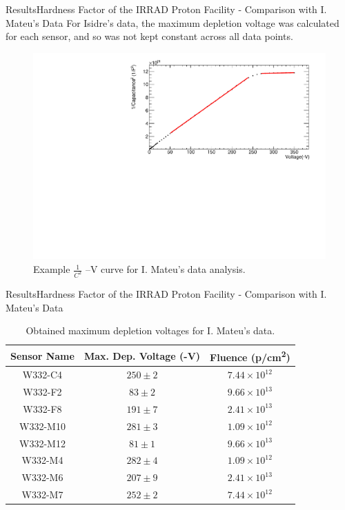 \documentclass{beamer}
\begin{document}
    \begin{frame}{Results}{Hardness Factor of the IRRAD Proton Facility - Comparison with I. Mateu's Data}
    For Isidre's data, the maximum depletion voltage was calculated for each sensor, and so was not kept constant across all data points.
        \begin{figure}
            \centering
            \includegraphics[width = 0.9\linewidth]{IsidreCVexample.pdf}
            \caption{Example $\frac{1}{C^2}$ --V curve for I. Mateu's data analysis.}
        \end{figure}
    \end{frame}
    
    \begin{frame}{Results}{Hardness Factor of the IRRAD Proton Facility - Comparison with I. Mateu's Data}
    \begin{table}[htb]
        \centering
        \begin{tabular}{|c|c|c|}
            \hline
            Sensor Name & Max. Dep. Voltage (-V) & Fluence (p/cm\textsuperscript{2}) \\
            \hline
            W332-C4 & $250\pm 2$ & $7.44\times 10^{12}$\\
            W332-F2 & $83\pm 2$ & $9.66 \times 10^{13}$\\
            W332-F8 & $191\pm 7$ & $2.41\times 10^{13}$\\
            W332-M10 & $281\pm 3$ & $1.09\times 10^{12}$\\
            W332-M12 & $81\pm 1$ & $9.66\times 10^{13}$\\
            W332-M4 & $282\pm 4$ & $1.09\times 10^{12}$\\
            W332-M6 & $207\pm 9$ & $2.41\times 10^{13}$\\
            W332-M7 & $252\pm 2$ & $7.44\times 10^{12}$\\
            \hline
        \end{tabular}
        \caption{Obtained maximum depletion voltages for I. Mateu's data.}
    \end{table}
    \end{frame}
    
\end{document}
